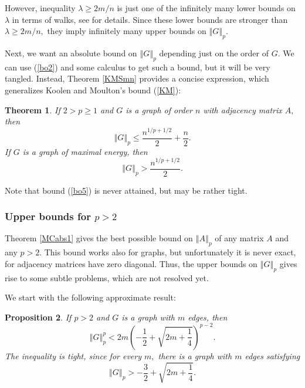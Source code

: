 \documentclass[12pt]{article}%
\newtheorem{theorem}{Theorem}[section]
\newtheorem{proposition}[theorem]{Proposition}
\begin{document}
However, inequality $\lambda\geq2m/n$ is just one of the infinitely many lower
bounds on $\lambda$ in terms of walks, see \cite{Nik06a} for details. Since
these lower bounds are stronger than $\lambda\geq2m/n,$ they imply infinitely
many upper bounds on $\left\Vert G\right\Vert _{p}.$\medskip

Next, we want an absolute bound on $\left\Vert G\right\Vert _{p}$ depending
just on the order of $G.$ We can use (\ref{bo2}) and some calculus to get such
a bound, but it will be very tangled. Instead, Theorem \ref{KMSmn} provides a
concise expression, which generalizes Koolen and Moulton's bound (\ref{KM}):

\begin{theorem}
\label{KMS}If $2>p\geq1$ and $G$ is a graph of order $n$ with adjacency matrix
$A,$ then
\begin{equation}
\left\Vert G\right\Vert _{p}\leq\frac{n^{1/p+1/2}}{2}+\frac{n}{2}. \label{bo5}%
\end{equation}
If $G$ is a graph of maximal energy, then
\[
\left\Vert G\right\Vert _{p}>\frac{n^{1/p+1/2}}{2}.
\]

\end{theorem}

Note that bound (\ref{bo5}) is never attained, but may be rather tight.

\subsubsection{Upper bounds for $p>2$}

Theorem \ref{MCabs1} gives the best possible bound on $\left\Vert A\right\Vert
_{p}$ of any matrix $A$ and any $p>2.$ This bound works also for graphs, but
unfortunately it is never exact, for adjacency matrices have zero diagonal.
Thus, the upper bounds on $\left\Vert G\right\Vert _{p}$ gives rise to some
subtle problems, which are not resolved yet.

We start with the following approximate result:

\begin{proposition}
\label{ps5}If $p>2$ and $G$ is a graph with $m$ edges, then
\begin{equation}
\left\Vert G\right\Vert _{p}^{p}<2m\left(  -\frac{1}{2}+\sqrt{2m+\frac{1}{4}%
}\right)  ^{p-2}. \label{SSp}%
\end{equation}
The inequality is tight, since for every $m,$ there is a graph with $m$ edges
satisfying
\begin{equation}
\left\Vert G\right\Vert _{p}>-\frac{3}{2}+\sqrt{2m+\frac{1}{4}}. \label{SSp1}%
\end{equation}

\end{proposition}
\end{document}
